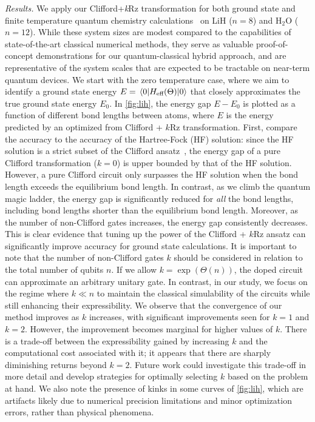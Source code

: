 \documentclass[a4paper,accepted=2024-07-10]{quantumarticle}
\begin{document}
\textit{Results.} We apply our Clifford+\textit{k}Rz transformation for both ground state and finite temperature quantum chemistry calculations~\cite{zhang2010impacts,RevModPhys.88.045005,DONOGHUE1985233,sun2021quantum,powers2023exploring} on LiH ($n=8$) and H$_{2}$O ($n=12$). While these system sizes are modest compared to the capabilities of state-of-the-art classical numerical methods, they serve as valuable proof-of-concept demonstrations for our quantum-classical hybrid approach, and are representative of the system scales that are expected to be tractable on near-term quantum devices. We start with the zero temperature case, where we aim to identify a ground state energy $E=\expval{H_{\text{eff}}(\Theta)}{0}$ that closely approximates the true ground state energy $E_0$. In \cref{fig:lih}, the energy gap $E-E_0$ is plotted as a function of different bond lengths between atoms, where $E$ is the energy predicted by an optimized from Clifford + $k$Rz transformation. First, compare the accuracy to the accuracy of the Hartree-Fock (HF) solution: since the HF solution is a strict subset of the Clifford ansatz~\cite{ravi2022cafqa}, the energy gap of a pure Clifford transformation ($k=0$) is upper bounded by that of the HF solution. However, a pure Clifford circuit only surpasses the HF solution when the bond length exceeds the equilibrium bond length. In contrast, as we climb the quantum magic ladder, the energy gap is significantly reduced for \emph{all} the bond lengths, including bond lengths shorter than the equilibrium bond length. Moreover, as the number of non-Clifford gates increases, the energy gap consistently decreases. This is clear evidence that tuning up the power of the Clifford + $k$Rz ansatz can significantly improve accuracy for ground state calculations. It is important to note that the number of non-Clifford gates $k$ should be considered in relation to the total number of qubits $n$. If we allow $k=\exp(\Theta(n))$, the doped circuit can approximate an arbitrary unitary gate. In contrast, in our study, we focus on the regime where $k \ll n$ to maintain the classical simulability of the circuits while still enhancing their expressibility. We observe that the convergence of our method improves as $k$ increases, with significant improvements seen for $k=1$ and $k=2$. However, the improvement becomes marginal for higher values of $k$. There is a trade-off between the expressibility gained by increasing $k$ and the computational cost associated with it; it appears that there are sharply diminishing returns beyond $k=2$. Future work could investigate this trade-off in more detail and develop strategies for optimally selecting $k$ based on the problem at hand. We also note the presence of kinks in some curves of \cref{fig:lih}, which are artifacts likely due to numerical precision limitations and minor optimization errors, rather than physical phenomena.
\end{document}
